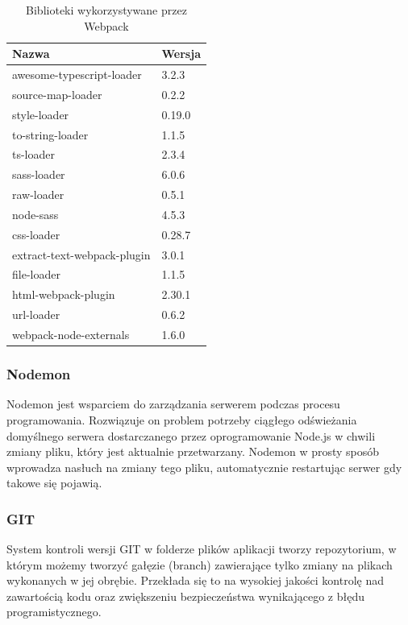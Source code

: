 \documentclass[eng,printmode]{mgr}
\begin{document}
\begin{table}[H]
\begin{tabularx}{\textwidth}{|X|X|}
   \hline
    \textbf{Nazwa} & \textbf{Wersja} \\
   \hline
     awesome-typescript-loader & 3.2.3 \\
   \hline
     source-map-loader & 0.2.2 \\
   \hline
     style-loader & 0.19.0 \\
   \hline
  	 to-string-loader & 1.1.5 \\
   \hline
   	 ts-loader & 2.3.4 \\
   \hline
   	 sass-loader & 6.0.6 \\
   \hline
   	 raw-loader & 0.5.1 \\
   \hline
   	 node-sass & 4.5.3 \\
   \hline
   	 css-loader & 0.28.7 \\
   \hline
     extract-text-webpack-plugin & 3.0.1 \\
   \hline
     file-loader & 1.1.5 \\
   \hline
     html-webpack-plugin & 2.30.1 \\
   \hline
     url-loader & 0.6.2 \\
   \hline
     webpack-node-externals & 1.6.0 \\
   \hline
\end{tabularx}
\caption{Biblioteki wykorzystywane przez Webpack}
\end{table}
   
\subsubsection{Nodemon}
Nodemon \cite{Nodemon} jest wsparciem do zarządzania serwerem podczas procesu programowania. Rozwiązuje on problem potrzeby ciągłego odświeżania domyślnego serwera dostarczanego przez oprogramowanie Node.js w chwili zmiany pliku, który jest aktualnie przetwarzany. Nodemon w prosty sposób wprowadza nasłuch na zmiany tego pliku, automatycznie restartując serwer gdy takowe się pojawią.

\subsubsection{GIT}
System kontroli wersji GIT \cite{GIT} w folderze plików aplikacji tworzy repozytorium, w którym możemy tworzyć gałęzie (branch) zawierające tylko zmiany na plikach wykonanych w jej obrębie. Przekłada się to na wysokiej jakości kontrolę nad zawartością kodu oraz zwiększeniu bezpieczeństwa wynikającego z błędu programistycznego. 
\end{document}
